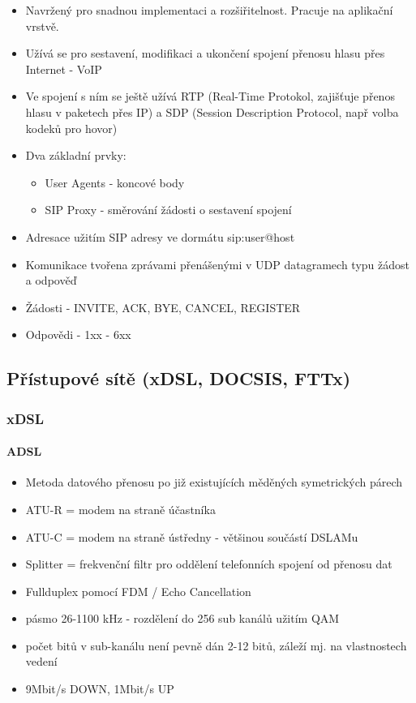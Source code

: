 \documentclass[10pt,a4paper]{article}
\begin{document}
\begin{itemize}
\item Navržený pro snadnou implementaci a rozšiřitelnost. Pracuje na aplikační vrstvě.
\item Užívá se pro sestavení, modifikaci a ukončení spojení přenosu hlasu přes Internet - VoIP
\item Ve spojení s ním se ještě užívá RTP (Real-Time Protokol, zajišťuje přenos hlasu v paketech přes IP) a SDP (Session Description Protocol, např volba kodeků pro hovor)
\item Dva základní prvky:
\begin{itemize}
\item User Agents - koncové body
\item SIP Proxy - směrování žádosti o sestavení spojení
\end{itemize}
\item Adresace užitím SIP adresy ve dormátu sip:user@host
\item Komunikace tvořena zprávami přenášenými v UDP datagramech typu žádost a odpověď
\item Žádosti - INVITE, ACK, BYE, CANCEL, REGISTER
\item Odpovědi - 1xx - 6xx
\end{itemize}

\subsection{Přístupové sítě (xDSL, DOCSIS, FTTx)}
\subsubsection{xDSL}
\paragraph{ADSL}
\begin{itemize}
\item Metoda datového přenosu po již existujících měděných symetrických párech
\item ATU-R = modem na straně účastníka
\item ATU-C = modem na straně ústředny - většinou součástí DSLAMu
\item Splitter = frekvenční filtr pro oddělení telefonních spojení od přenosu dat
\item Fullduplex pomocí FDM / Echo Cancellation
\item pásmo 26-1100 kHz - rozdělení do 256 sub kanálů užitím QAM
\item počet bitů v sub-kanálu není pevně dán 2-12 bitů, záleží mj. na vlastnostech vedení
\item 9Mbit/s DOWN, 1Mbit/s UP
\end{itemize}
\end{document}
